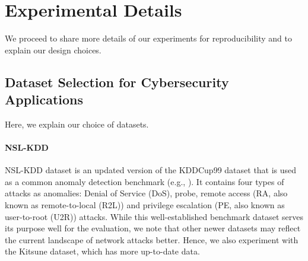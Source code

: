 \documentclass{article}
\begin{document}
\section{Experimental Details}
\label{appendix:exp_details}

We proceed to share more details of our experiments for reproducibility and to explain our design choices.

\subsection{Dataset Selection for Cybersecurity Applications}
\label{appendix:data_details}
Here, we explain our choice of datasets.


\paragraph*{NSL-KDD}
NSL-KDD dataset is an updated version of the KDDCup99 dataset \citep{kddcup99_dataset} that is used as a common anomaly detection benchmark (e.g., \citet{deep_ad_SSL_adv_training, AD_tabular_data_internal_contrastive_learning, NeuTraL_AD, lipschitz_ae_AD}).
It contains four types of attacks as anomalies: Denial of Service (DoS), probe, remote access (RA, also known as remote-to-local (R2L)) and privilege escalation (PE, also known as user-to-root (U2R)) attacks. 
While this well-established benchmark dataset serves its purpose well for the evaluation, we note that other newer datasets may reflect the current landscape of network attacks better.
Hence, we also experiment with the Kitsune dataset, which has more up-to-date data.
\end{document}
